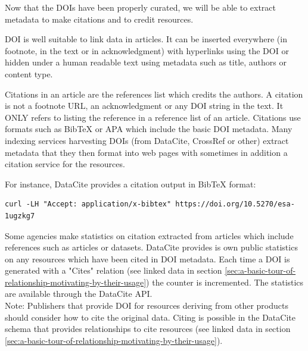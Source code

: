 \documentclass[11pt,a4paper]{ivoa}
\newcommand{\datacitedocurl}{https://datacite-metadata-schema.readthedocs.io/en/4.6}
\newcommand{\datacitepropurl}[1]{\datacitedocurl/properties/#1}
\newcommand{\datacitetag}[2]{\href{\datacitepropurl{#1}}{\textcolor{blue}{\mbox{datacite:\textbf{#2}}}}}
\begin{document}
Now that the DOIs have been properly curated, we will be able to extract metadata to make citations and to credit resources.

DOI is well suitable to link data in articles. It can be inserted everywhere (in footnote, in the text or in acknowledgment) with hyperlinks using the DOI or hidden under a human readable text using metadata such as title, authors or content type.

Citations in an article are the references list which credits the authors. A citation is not a footnote URL, an acknowledgment or any DOI string in the text. It ONLY refers to listing the reference in a reference list of an article.\newline
Citations use formats such as BibTeX or APA which include the basic DOI metadata. Many indexing services  harvesting  DOIs (from DataCite, CrossRef or other) extract metadata that they then format into web pages with sometimes in addition a citation service for the resources.


For instance, DataCite provides a citation output in BibTeX format:

\begin{lstlisting}
curl -LH "Accept: application/x-bibtex" https://doi.org/10.5270/esa-1ugzkg7
\end{lstlisting}

Some agencies make statistics on citation extracted from articles which include references such as articles or datasets. DataCite provides is own public statistics on any resources which have been cited in DOI metadata. Each time a DOI is generated with a "Cites" relation (see linked data in section \ref{sec:a-basic-tour-of-relationship-motivating-by-their-usage}) the counter is incremented. The statistics are available through the DataCite API.\\

Note: Publishers that provide DOI for resources deriving from other products should consider how to cite the original data. Citing is possible in the DataCite schema that provides relationships to cite resources (see linked data in section \ref{sec:a-basic-tour-of-relationship-motivating-by-their-usage}). %
\end{document}
